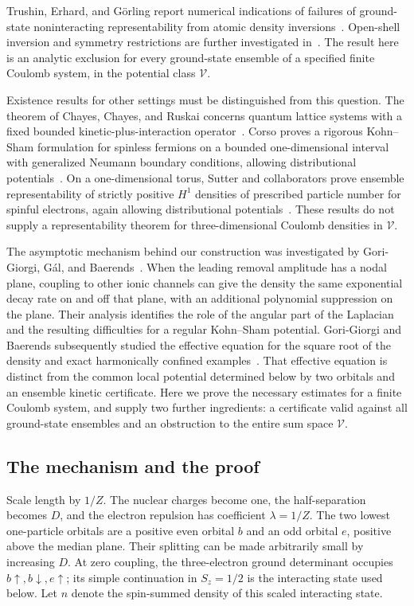 \documentclass[11pt,a4paper]{article}
\theoremstyle{definition}
\theoremstyle{remark}
\numberwithin{equation}{section}
\begin{document}
Trushin, Erhard, and G\"orling report numerical indications of
failures of ground-state noninteracting representability from
atomic density inversions~\cite{TEG24}. Open-shell inversion and
symmetry restrictions are further investigated in~\cite{ETG25}.
The result here is an analytic exclusion for every ground-state
ensemble of a specified finite Coulomb system, in the potential
class \(\mathcal V\).

Existence results for other settings must be distinguished from this
question. The theorem of Chayes, Chayes, and Ruskai concerns quantum
lattice systems with a fixed bounded kinetic-plus-interaction
operator~\cite{CCR85}. Corso proves a rigorous Kohn--Sham formulation
for spinless fermions on a bounded one-dimensional interval with
generalized Neumann boundary conditions, allowing distributional
potentials~\cite{Corso26}. On a one-dimensional torus,
Sutter and collaborators prove ensemble representability of strictly
positive \(H^1\) densities of prescribed particle number for spinful
electrons, again allowing distributional potentials~\cite{Sutter24}.
These results do not supply
a representability theorem for three-dimensional Coulomb densities
in \(\mathcal V\).

The asymptotic mechanism behind our construction was investigated
by Gori-Giorgi, G\'al, and Baerends~\cite{GGB}.
When the leading removal amplitude has a nodal plane, coupling to
other ionic channels can give the density the same exponential
decay rate on and off that plane, with an additional polynomial
suppression on the plane. Their analysis identifies the role of
the angular part of the Laplacian and the resulting difficulties
for a regular Kohn--Sham potential.
Gori-Giorgi and Baerends subsequently studied the effective equation
for the square root of the density and exact harmonically confined
examples~\cite{GGB18}. That effective equation is distinct from the
common local potential determined below by two orbitals and an
ensemble kinetic certificate.
Here we prove the necessary estimates for a finite Coulomb system,
and supply two further ingredients: a certificate valid against
all ground-state ensembles and an obstruction to the entire sum
space \(\mathcal V\).

\subsection{The mechanism and the proof}

Scale length by \(1/Z\). The nuclear charges become one, the
half-separation becomes \(D\), and the electron repulsion has
coefficient \(\lambda=1/Z\).
The two lowest one-particle orbitals are a positive even orbital
\(b\) and an odd orbital \(e\), positive above the median plane.
Their splitting can be made arbitrarily small by increasing \(D\).
At zero coupling, the three-electron ground determinant occupies
\(b\uparrow,b\downarrow,e\uparrow\); its simple continuation in
\(S_z=1/2\) is the interacting state used below.
Let \(n\) denote the spin-summed density of this scaled interacting state.
\end{document}
